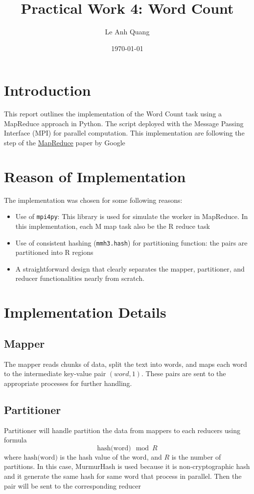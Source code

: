 \documentclass{article}
\title{Practical Work 4: Word Count}
\author{Le Anh Quang}
\date{\today}
\begin{document}
	
	\maketitle
	
	\section*{Introduction}
	This report outlines the implementation of the Word Count task using a MapReduce approach in Python. The script deployed with the Message Passing Interface (MPI) for parallel computation. This implementation are following the step of the \href{https://static.googleusercontent.com/media/research.google.com/en//archive/mapreduce-osdi04.pdf}{MapReduce} paper by Google
	
	\section*{Reason of Implementation}
	The implementation was chosen for some following reasons:
	\begin{itemize}
		\item Use of \texttt{mpi4py}: This library is used for simulate the 
		worker in MapReduce. In this implementation, each M map task also be the R reduce task
		\item Use of consistent hashing (\texttt{mmh3.hash}) for partitioning function: the pairs are partitioned into R regions
		\item A straightforward design that clearly separates the mapper, partitioner, and reducer functionalities nearly from scratch.
	\end{itemize}
	
	\section*{Implementation Details}
	
	\subsection*{Mapper}
	The mapper reads chunks of data, split the text into words, and maps each word to the intermediate key-value pair $(word, 1)$. These pairs are sent to the appropriate processes for further handling.

	
	\subsection*{Partitioner}
	Partitioner will handle partition the data from mappers to each reducers using formula 
	\[
	\text{hash(word)}\mod R
	\] 
	where \(\text{hash(word)}\) is the hash value of the word, and \(R\) is the number of partitions. In this case, MurmurHash is used because it is non-cryptographic hash and it generate the same hash for same word that process in parallel. Then the pair will be sent to the corresponding reducer
\end{document}
